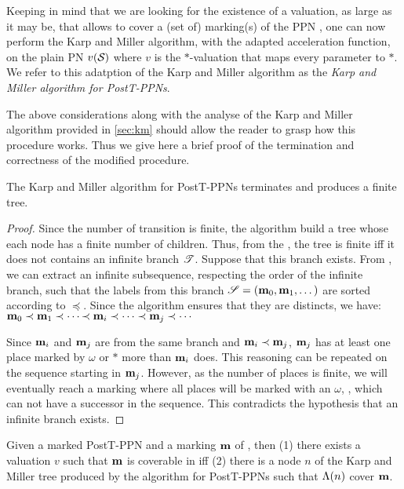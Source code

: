 Keeping in mind that we are looking for the existence of a valuation, as large as it may be, that allows to cover a (set of) marking(s) of the \ac{PPN} \namePPN, one can now perform the Karp and Miller algorithm, with the adapted acceleration function, on the plain \ac{PN} $v(\mathcal{S}_{{}})$ where $v$ is the $*$-valuation that maps every parameter to $*$.
We refer to this adatption of the Karp and Miller algorithm as the \emph{Karp and Miller algorithm for PostT-PPNs}.

The above considerations along with the analyse of the Karp and Miller algorithm provided in \cref{sec:km} should allow the reader to grasp how this procedure works.
Thus we give here a brief proof of the termination and correctness of the modified procedure.

\begin{theo}
  \label{theo:km-ecov-postt-ppn-termination}
  The Karp and Miller algorithm for PostT-PPNs
  terminates and produces a finite tree.
\end{theo}

\begin{proof}
  Since the number of transition is finite, the algorithm build a tree whose each node has a finite number of children.
  Thus, from the , the tree is finite iff it does not contains an infinite branch $\mathscr{T}$. 
  Suppose that this branch exists.
  From , we can extract an infinite subsequence, respecting the order of the infinite branch, such that the labels from this branch $\defInfSeq[\seq][\mar][0][1]$ are sorted according to $\preceq$.
  Since the algorithm ensures that they are distincts, we have:
  \( \elemsInfSeq[\mar][0][1][\prec \mar_i \prec \dotsb \prec \mar_j \prec \dotsb][\prec][\dotsb] \)
  
  Since $\mathbf{m}_i$ and $\mathbf{m}_j$ are from the same branch and $\mathbf{m}_i \prec \mathbf{m}_j$, $\mathbf{m}_j$ has at least one place marked by $\omega$ or $*$ more than $\mathbf{m}_i$ does.
  This reasoning can be repeated on the sequence starting in $\mathbf{m}_j$.
  However, as the number of places is finite, we will eventually reach a marking where all places will be marked with an $\omega$, \ie, which can not have a successor in the sequence.
  This contradicts the hypothesis that an infinite branch exists.
\end{proof}

\begin{theo}
  \label{theo:km-ecov-postt-ppn-correctness}
  Given a marked PostT-PPN \namePPN and a marking $\mathbf{m}$ of \namePPN,
    then \qquad (1)
    there exists a valuation $v$ such that $\mathbf{m}$ is coverable in \namePPN
    \qquad iff \qquad (2)
    there is a node $n$ of the Karp and Miller tree produced by the algorithm for PostT-PPNs
      such that $\operatorname{\Lambda}(n)$ cover $\mathbf{m}$.
\end{theo}

